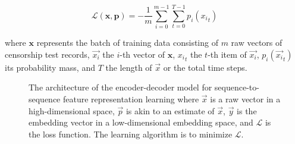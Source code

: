 \begin{equation}\label{eq:loss}
	\mathcal{L}(\mathbf{x}, \mathbf{p}) = - \frac{1}{m}
		\sum\limits_{i=0}^{m-1}
			\sum\limits_{t=0}^{T-1}
				{p}_i({x_i}_{t})
\end{equation}

\noindent where $\mathbf{x}$ represents the batch of training data consisting
of $m$ raw vectors of censorship test records, $\vec{x_i}$ the $i$-th vector
of $\mathbf{x}$, ${x_i}_{t}$ the $t$-th item of $\vec{x_i}$,
${p}_i(\vec{x_i}_t)$ its probability mass, and $T$ the length of
$\vec{x}$ or the total time steps. 



\begin{figure}[!htbp]
	\centering
	\caption{The architecture of the encoder-decoder model for
	sequence-to-sequence feature representation learning where $\vec{x}$ is
	a raw vector in a high-dimensional space, $\vec{p}$ is akin to
	an estimate of $\vec{x}$, $\vec{y}$ is the embedding vector in a
	low-dimensional embedding space, and $\mathcal{L}$ is the loss function. The
	learning algorithm is to minimize $\mathcal{L}$.}
	\label{fig:model:arch}
\end{figure}

